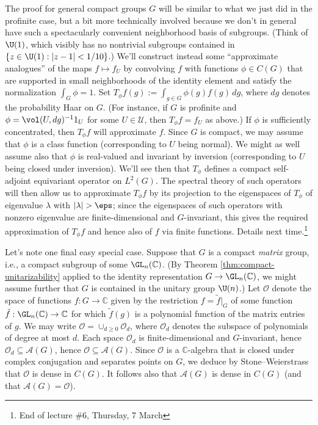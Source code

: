\documentclass[reqno]{amsart} 
\begin{document}
The proof for general compact groups $G$ will be similar to what we just did in the profinite case, but a bit more technically involved because we don't in general have such a spectacularly convenient neighborhood basis of subgroups.  (Think of $\U(1)$, which visibly has no nontrivial subgroups contained in $\{z \in \U(1) : |z - 1| < 1/10\}$.)  We'll construct instead some ``approximate analogues'' of the maps $f \mapsto f_U$ by convolving $f$ with functions $\phi \in C(G)$ that are supported in small neighborhoods of the identity element and satisfy the normalization $\int_G \phi = 1$.  Set $T_\phi f(g) := \int_{g \in G} \phi(g) f(g) \, d g$, where $d g$ denotes the probability Haar on $G$.  (For instance, if $G$ is profinite and $\phi = \vol(U, d g)^{-1} 1_U$ for some $U \in \mathcal{U}$, then $T_\phi f = f_U$ as above.)  If $\phi$ is sufficiently concentrated, then $T_\phi f$ will approximate $f$.  Since $G$ is compact, we may assume that $\phi$ is a class function (corresponding to $U$ being normal).  We might as well assume also that $\phi$ is real-valued and invariant by inversion (corresponding to $U$ being closed under inversion).  We'll see then that $T_\phi$ defines a compact self-adjoint equivariant operator on $L^2(G)$.  The spectral theory of such operators will then allow us to approximate $T_\phi f$ by its projection to the eigenspaces of $T_\phi$ of eigenvalue $\lambda$ with $|\lambda| > \eps$; since the eigenspaces of such operators with nonzero eigenvalue are finite-dimensional and $G$-invariant, this gives the required approximation of $T_\phi f$ and hence also of $f$ via finite functions.  Details next time.\footnote{End of lecture \#6, Thursday, 7 March}

Let's note one final easy special case.  Suppose that $G$ is a compact \emph{matrix} group, i.e., a compact subgroup of some $\GL_n(\mathbb{C})$.  (By Theorem \ref{thm:compact-unitarizability} applied to the identity representation $G \rightarrow \GL_n(\mathbb{C})$, we might assume further that $G$ is contained in the unitary group $\U(n)$.)  Let $\mathcal{O}$ denote the space of functions $f : G \rightarrow \mathbb{C}$ given by the restriction $f = \tilde{f}|_G$ of some function $\tilde{f} : \GL_n(\mathbb{C}) \rightarrow \mathbb{C}$ for which $\tilde{f}(g)$ is a polynomial function of the matrix entries of $g$.  We may write $\mathcal{O} = \cup_{d \geq 0} \mathcal{O}_d$, where $\mathcal{O}_d$ denotes the subspace of polynomials of degree at most $d$.  Each space $\mathcal{O}_d$ is finite-dimensional and $G$-invariant, hence $\mathcal{O}_d \subseteq \mathcal{A}(G)$, hence $\mathcal{O} \subseteq \mathcal{A}(G)$.  Since $\mathcal{O}$ is a $\mathbb{C}$-algebra that is closed under complex conjugation and separates points on $G$, we deduce by Stone--Weierstrass that $\mathcal{O}$ is dense in $C(G)$.  It follows also that $\mathcal{A}(G)$ is dense in $C(G)$ (and that $\mathcal{A}(G) = \mathcal{O}$).
\end{document}
